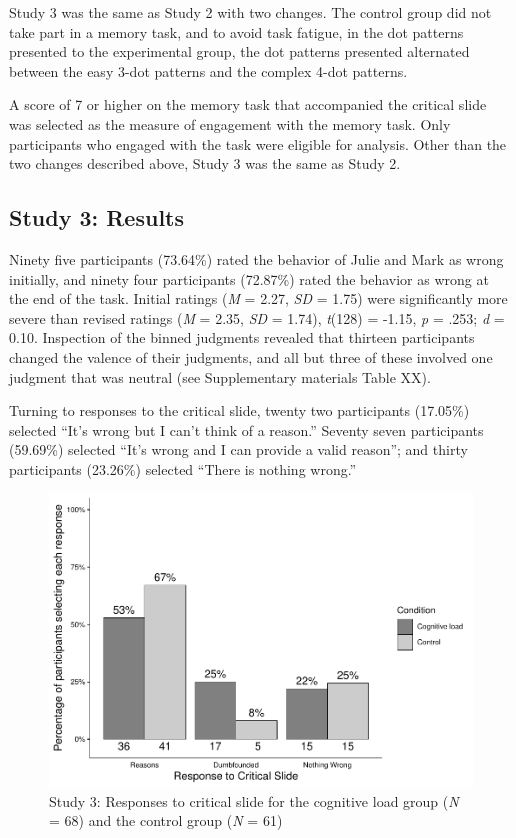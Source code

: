 \documentclass[
  american,
  man,floatsintext]{apa7}
\begin{document}
Study 3 was the same as Study 2 with two changes. The control group did not take part in a memory task, and to avoid task fatigue, in the dot patterns presented to the experimental group, the dot patterns presented alternated between the easy 3-dot patterns and the complex 4-dot patterns.

A score of 7 or higher on the memory task that accompanied the critical slide was selected as the measure of engagement with the memory task. Only participants who engaged with the task were eligible for analysis. Other than the two changes described above, Study 3 was the same as Study 2.

\hypertarget{study-3-results}{%
\subsection{Study 3: Results}\label{study-3-results}}

Ninety five participants (73.64\%) rated the behavior of Julie and Mark as wrong initially, and ninety four participants (72.87\%) rated the behavior as wrong at the end of the task. Initial ratings (\emph{M} = 2.27, \emph{SD} = 1.75) were significantly more severe than revised ratings (\emph{M} = 2.35, \emph{SD} = 1.74), \emph{t}(128) = -1.15, \emph{p} = .253; \emph{d} = 0.10. Inspection of the binned judgments revealed that thirteen participants changed the valence of their judgments, and all but three of these involved one judgment that was neutral (see Supplementary materials Table XX).

Turning to responses to the critical slide, twenty two participants (17.05\%) selected ``It's wrong but I can't think of a reason.'' Seventy seven participants (59.69\%) selected ``It's wrong and I can provide a valid reason''; and thirty participants (23.26\%) selected ``There is nothing wrong.''

\newpage

\begin{figure}
\centering
\includegraphics{Study_3_files/figure-latex/S3ch5S3fig2criticalcondition-1.pdf}
\caption{\label{fig:S3ch5S3fig2criticalcondition}Study 3: Responses to critical slide for the cognitive load group (\emph{N} = 68) and the control group (\emph{N} = 61)}
\end{figure}
\end{document}
